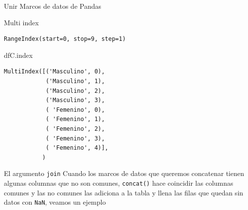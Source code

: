\documentclass[
  ignorenonframetext,
  aspectratio=169,
  spanish,
]{beamer}
\newenvironment{Shaded}{\begin{snugshade}}{\end{snugshade}}
\newcommand{\NormalTok}[1]{\textcolor[rgb]{0.00,0.23,0.31}{#1}}
\begin{document}
\begin{frame}[fragile]{Unir Marcos de datos de Pandas}
\begin{block}{Multi index}
\begin{verbatim}
RangeIndex(start=0, stop=9, step=1)
\end{verbatim}

\begin{Shaded}
\begin{Highlighting}[]
\NormalTok{dfC.index}
\end{Highlighting}
\end{Shaded}

\begin{verbatim}
MultiIndex([('Masculino', 0),
            ('Masculino', 1),
            ('Masculino', 2),
            ('Masculino', 3),
            ( 'Femenino', 0),
            ( 'Femenino', 1),
            ( 'Femenino', 2),
            ( 'Femenino', 3),
            ( 'Femenino', 4)],
           )
\end{verbatim}
\end{block}

\begin{block}{El argumento \texttt{join}}
\label{el-argumento-join}
Cuando los marcos de datos que queremos concatenar tienen algunas
columnas que no son comunes, \texttt{concat()} hace coincidir las
columnas comunes y las no comunes las adiciona a la tabla y llena las
filas que quedan sin datos con \texttt{NaN}, veamos un ejemplo
\end{block}


\end{frame}
\end{document}
